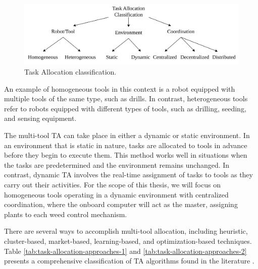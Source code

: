 \begin{figure}[bth]
    \centering
    \includegraphics[width=0.9\linewidth]{gfx/ch01/task-allocation-classification.png}
    \caption{Task Allocation classification.}
    \label{fig:task-allocation-classification}
\end{figure}

An example of homogeneous tools in this context is a robot equipped with multiple tools of the same type, such as drills. In contrast, heterogeneous tools refer to robots equipped with different types of tools, such as drilling, seeding, and sensing equipment.

The multi-tool \ac{TA} can take place in either a dynamic or static environment. In an environment that is static in nature, tasks are allocated to tools in advance before they begin to execute them. This method works well in situations when the tasks are predetermined and the environment remains unchanged. In contrast, dynamic \ac{TA} involves the real-time assignment of tasks to tools as they carry out their activities. For the scope of this thesis, we will focus on homogeneous tools operating in a dynamic environment with centralized coordination, where the onboard computer will act as the master, assigning plants to each weed control mechanism.

There are several ways to accomplish multi-tool allocation, including heuristic, cluster-based, market-based, learning-based, and optimization-based techniques. Table \ref{tab:task-allocation-approaches-1} and \ref{tab:task-allocation-approaches-2} presents a comprehensive classification of \ac{TA} algorithms found in the literature \cite{Umashankar2024}.

